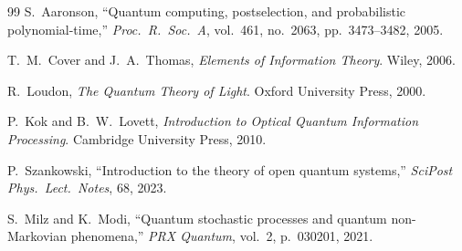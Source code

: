 \documentclass[12pt,a4paper]{article}
\theoremstyle{definition}
\theoremstyle{plain}
\begin{document}
\begin{thebibliography}{99}
S.~Aaronson, ``Quantum computing, postselection, and probabilistic polynomial-time,'' \textit{Proc.\ R.\ Soc.\ A}, vol.~461, no.~2063, pp.~3473--3482, 2005.

T.~M.~Cover and J.~A.~Thomas, \textit{Elements of Information Theory}. Wiley, 2006.

R.~Loudon, \textit{The Quantum Theory of Light}. Oxford University Press, 2000.

P.~Kok and B.~W.~Lovett, \textit{Introduction to Optical Quantum Information Processing}. Cambridge University Press, 2010.

P.~Szankowski, ``Introduction to the theory of open quantum systems,'' \textit{SciPost Phys.\ Lect.\ Notes}, 68, 2023.

S.~Milz and K.~Modi, ``Quantum stochastic processes and quantum non-Markovian phenomena,'' \textit{PRX Quantum}, vol.~2, p.~030201, 2021. 
\end{thebibliography}
\end{document}
